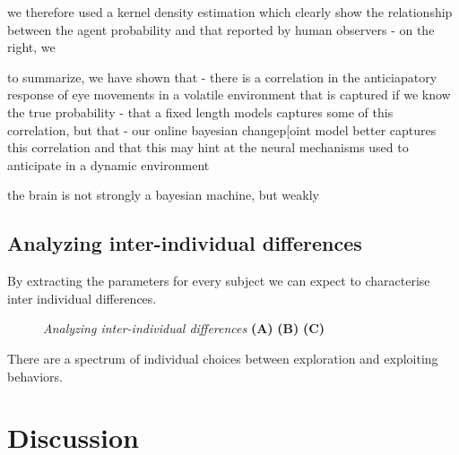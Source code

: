 \documentclass[profile,final,english, draft]{article}%
\begin{document}
we therefore used a kernel density estimation which clearly show the relationship between the agent probability and that reported by human observers
- on the right, we

to summarize, we have shown that
- there is a correlation in the anticiapatory response of eye movements in a volatile environment that is captured if we know the true probability
- that a fixed length models captures some of this correlation, but that
- our online bayesian changep[oint model better captures this correlation and that this may hint at the neural mechanisms used to anticipate in a dynamic environment

the brain is not strongly a bayesian machine, but weakly



\subsection{Analyzing inter-individual differences}

By extracting the parameters for every subject we can expect to characterise inter individual differences. 

\begin{figure}%
\caption{\emph{Analyzing inter-individual differences} \textbf{(A)} 
\textbf{(B)} 
\textbf{(C)}  }
\label{fig:results_psycho_inter}
\end{figure}

There are a spectrum of individual choices between exploration and exploiting behaviors.



\section{Discussion}
\end{document}
